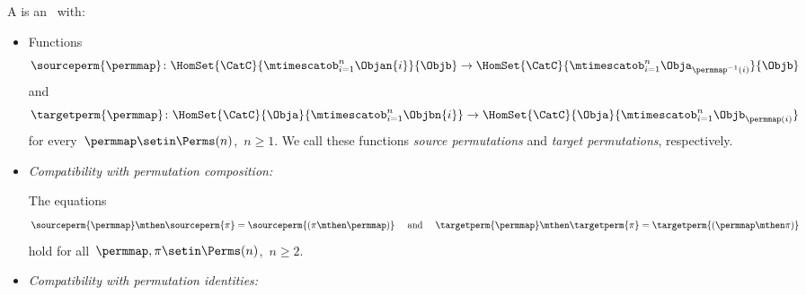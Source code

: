 \begin{ctdefinition}
    \label{def:symmetric-stacking-category}
    A  is an  ~\CatC with:

    \constit

    \begin{itemize}
        \item Functions
              \begin{equation}
                  \sourceperm{\permmap} \colon \HomSet{\CatC}{\mtimescatob_{i=1}^n \Objan{i}}{\Objb} \to \HomSet{\CatC}{\mtimescatob_{i=1}^n \Obja_{\permmap^{-1}(i)}}{\Objb}
              \end{equation}
              and
              \begin{equation}
                  \targetperm{\permmap} \colon \HomSet{\CatC}{\Obja}{\mtimescatob_{i=1}^n \Objbn{i}} \to \HomSet{\CatC}{\Obja}{\mtimescatob_{i=1}^n \Objb_{\permmap(i)}}
              \end{equation}
              for every~$\permmap \setin \Perms(n)$,~$n \geq 1$.
              We call these functions \emph{source permutations} and \emph{target permutations}, respectively.
    \end{itemize}

    \condit

    \begin{itemize}

      

        \item \emph{Compatibility with permutation composition:}

              The equations
              \begin{equation}
                  \label{eq:perm-compatibility-with-perm-comp}
                  \sourceperm{\permmap} \mthen \sourceperm{\pi} = \sourceperm{(\pi\mthen\permmap)}
                  \quad \text{ and } \quad
                  \targetperm{\permmap} \mthen \targetperm{\pi} = \targetperm{(\permmap \mthen \pi)}
              \end{equation}
              hold for all~$\permmap, \pi \setin \Perms(n)$,~$n \geq 2$.
              
        \item \emph{Compatibility with permutation identities:}


\end{itemize}
\end{ctdefinition}
